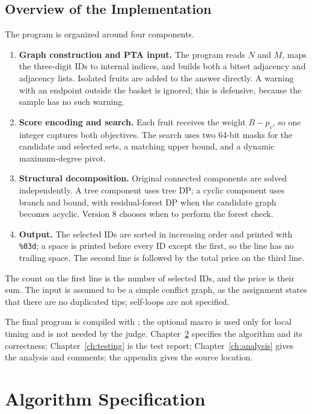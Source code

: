 \documentclass[12pt,a4paper]{report}
\newcommand{\code}[1]{\texttt{\detokenize{#1}}}
\begin{document}
\section{Overview of the Implementation}

The program is organized around four components.
\begin{enumerate}
\item \textbf{Graph construction and PTA input.}  The program reads $N$ and $M$,
      maps the three-digit IDs to internal indices, and builds both a bitset
      adjacency and adjacency lists.  Isolated fruits are added to the answer
      directly.  A warning with an endpoint outside the basket is ignored; this
      is defensive, because the sample has no such warning.
\item \textbf{Score encoding and search.}  Each fruit receives the weight
      $B-p_v$, so one integer captures both objectives.  The search uses two
      64-bit masks for the candidate and selected sets, a matching upper bound,
      and a dynamic maximum-degree pivot.
\item \textbf{Structural decomposition.}  Original connected components are
      solved independently.  A tree component uses tree DP; a cyclic component
      uses branch and bound, with residual-forest DP when the candidate graph
      becomes acyclic.  Version 8 chooses when to perform the forest check.
\item \textbf{Output.}  The selected IDs are sorted in increasing order and
      printed with \texttt{\%03d}; a space is printed before every ID except
      the first, so the line has no trailing space.  The second line is followed
      by the total price on the third line.
\end{enumerate}
The count on the first line is the number of selected IDs, and the price is
their sum.  The input is assumed to be a simple conflict graph, as the
assignment states that there are no duplicated tips; self-loops are not
specified.

The final program is compiled with \code{gcc -O2 -std=c99}; the optional
\code{-DBENCH} macro is used only for local timing and is not needed by the
judge.  Chapter~\ref{ch:algorithm} specifies the algorithm and its correctness;
Chapter~\ref{ch:testing} is the test report; Chapter~\ref{ch:analysis} gives the
analysis and comments; the appendix gives the source location.

\chapter{Algorithm Specification}\label{ch:algorithm}
\end{document}
